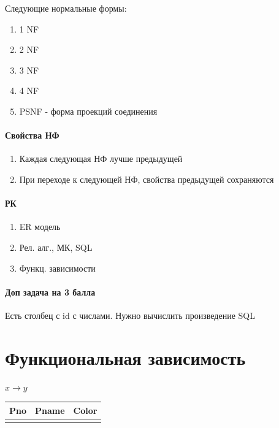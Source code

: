 \documentclass[a4paper, 14pt]{report}
\begin{document}
Следующие нормальные формы:

\begin{enumerate}
    \item 1 NF
    \item 2 NF
    \item 3 NF
    \item 4 NF
    \item PSNF - форма проекций соединения
\end{enumerate}

\paragraph{Свойства НФ}

\begin{enumerate}
    \item Каждая следующая НФ лучше предыдущей
    \item При переходе к следующей НФ, свойства предыдущей сохраняются
\end{enumerate}

\paragraph{РК}

\begin{enumerate}
    \item ER модель
    \item Рел. алг., МК, SQL
    \item Функц. зависимости
\end{enumerate}

\paragraph{Доп задача на 3 балла}

Есть столбец с id с числами. Нужно вычислить произведение SQL

\section{Функциональная зависимость}

$x \to y$

\begin{tabular}{|c|c|c|}
    \hline
    Pno & Pname & Color \\
    \hline
        &       &       \\
\end{tabular}
\end{document}
